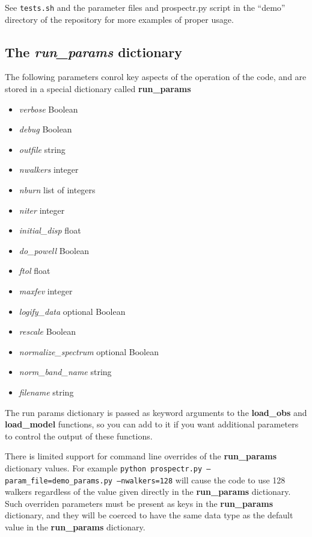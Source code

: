 \documentclass[12pt, letterpaper, preprint]{aastex}
\begin{document}
See \texttt{tests.sh} and the parameter files and prospectr.py
script in the ``demo'' directory of the repository for more examples
of proper usage.

\subsection{The \emph{run\_params} dictionary}
The following parameters conrol key aspects of the operation of the
code, and are stored in a special dictionary called {\bf run\_params}

\begin{itemize}
\item {\it verbose} Boolean
\item {\it debug} Boolean
\item {\it outfile} string

\item {\it nwalkers} integer
\item {\it nburn} list of integers
\item {\it niter} integer

\item {\it initial\_disp} float
\item {\it do\_powell} Boolean
\item {\it ftol} float
\item {\it maxfev} integer


\item {\it logify\_data} optional Boolean
\item {\it rescale} Boolean
\item {\it normalize\_spectrum} optional Boolean
\item {\it norm\_band\_name} string

\item {\it filename} string
\end{itemize}

The run params dictionary is passed as keyword arguments to the
{\bf load\_obs} and {\bf load\_model} functions, so you can add to it if you want
additional parameters to control the output of these functions.

There is limited support for command line overrides of the {\bf
run\_params} dictionary values. For example
\texttt{python prospectr.py --param\_file=demo\_params.py
  --nwalkers=128}
will cause the code to use 128 walkers regardless of the value given
directly in the {\bf run\_params} dictionary.  Such overriden
parameters must be present as keys in the {\bf run\_params} dictionary,
and they will be coerced to have the same data type as the default
value in the {\bf run\_params} dictionary.
\end{document}
